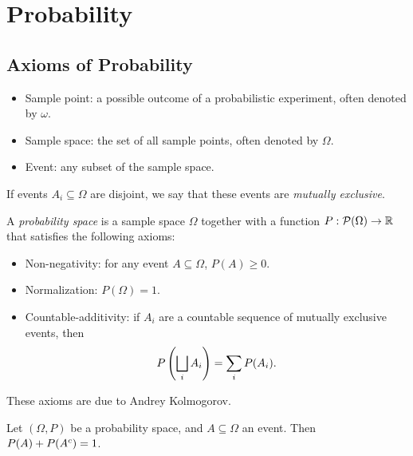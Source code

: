 \chapter{Probability}
\label{ch:probability}

\section{Axioms of Probability}

\begin{defn}\proofbreak
    \begin{itemize}
        \item Sample point: a possible outcome of a probabilistic experiment, often denoted by $\omega$.
        \item Sample space: the set of all sample points, often denoted by $\Omega$.
        \item Event: any subset of the sample space.
    \end{itemize}
\end{defn}

\begin{defn}
    If events $A_i \subseteq \Omega$ are disjoint, we say that these events are \emph{mutually exclusive}.
\end{defn}

\begin{defn}\label{kolmogorov-probability-axioms}
    A \emph{probability space} is a sample space $\Omega$ together with a function $P: \mathcal{P}(\Omega) \to \mathbb{R}$ that satisfies the following axioms:
    \begin{itemize}
        \item Non-negativity: for any event $A \subseteq \Omega$, $P(A) \geq 0$.
        \item Normalization: $P(\Omega) = 1$.
        \item Countable-additivity: if $A_i$ are a countable sequence of mutually exclusive events, then \[P\left(\bigsqcup_{i}A_i\right) = \sum_{i}P(A_i).\]
    \end{itemize}
\end{defn}

\begin{rmk}
    These axioms are due to Andrey Kolmogorov.
\end{rmk}

\begin{prop}
    Let $(\Omega, P)$ be a probability space, and $A \subseteq \Omega$ an event. Then $P(A) + P(A^{c}) = 1$.
\end{prop}

